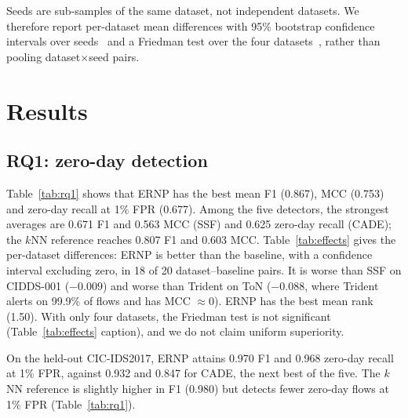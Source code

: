 \documentclass[preprint,12pt]{elsarticle}
\begin{document}
Seeds are sub-samples of the same dataset, not independent datasets. We therefore report per-dataset mean differences with 95\% bootstrap confidence intervals over seeds~\cite{efron1993bootstrap} and a Friedman test over the four datasets~\cite{demsar2006statistical}, rather than pooling dataset$\times$seed pairs.

\section{Results}\label{sec:results}
\subsection{RQ1: zero-day detection}\label{sec:rq1}
Table~\ref{tab:rq1} shows that ERNP has the best mean F1 (0.867), MCC (0.753) and zero-day recall at 1\% FPR (0.677). Among the five detectors, the strongest averages are 0.671 F1 and 0.563 MCC (SSF) and 0.625 zero-day recall (CADE); the $k$NN reference reaches 0.807 F1 and 0.603 MCC. Table~\ref{tab:effects} gives the per-dataset differences: ERNP is better than the baseline, with a confidence interval excluding zero, in 18 of 20 dataset--baseline pairs. It is worse than SSF on CIDDS-001 ($-0.009$) and worse than Trident on ToN ($-0.088$, where Trident alerts on 99.9\% of flows and has MCC $\approx0$). ERNP has the best mean rank (1.50). With only four datasets, the Friedman test is not significant (Table~\ref{tab:effects} caption), and we do not claim uniform superiority.

On the held-out CIC-IDS2017, ERNP attains 0.970 F1 and 0.968 zero-day recall at 1\% FPR, against 0.932 and 0.847 for CADE, the next best of the five. The $k$NN reference is slightly higher in F1 (0.980) but detects fewer zero-day flows at 1\% FPR (Table~\ref{tab:rq1}).

\begin{table}[t]
\centering\small
\caption{RQ1: mean$\pm$std over five seeds, causal protocol, $B=200$. Bold: best per column within each metric. GBM+AL: same classifier, features and alert-group labelling without the novelty prior.}\label{tab:rq1}
\resizebox{\linewidth}{!}{}
\end{table}

\begin{table}[t]
\centering\small
\caption{RQ1: F1 difference ERNP $-$ baseline per dataset, mean over seeds [95\% bootstrap CI]. Bold: CI above zero; underlined: CI below zero. Friedman test over the four datasets (six methods): $p=\friedmanp$.}\label{tab:effects}
\resizebox{\linewidth}{!}{}
\end{table}
\end{document}
